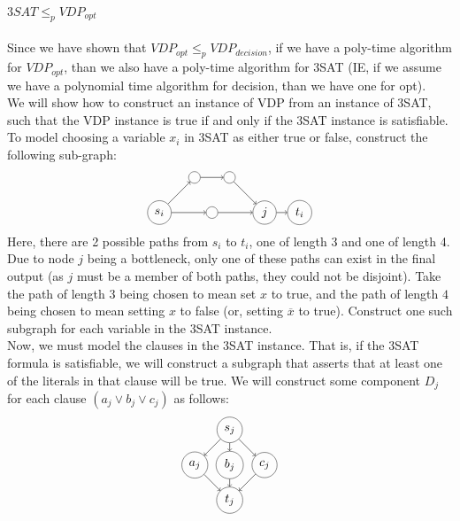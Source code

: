 \documentclass[letterpaper,notitlepage,twoside]{article}
\begin{document}
$3SAT \leq _{p} VDP_{opt}$\\\\
Since we have shown that $VDP_{opt} \leq _{p} VDP_{decision}$, if we have a poly-time algorithm for $VDP_{opt}$, than we also have a poly-time algorithm for 3SAT (IE, if we assume we have a polynomial time algorithm for decision, than we have one for opt). \\
We will show how to construct an instance of VDP from an instance of 3SAT, such that the VDP instance is true if and only if the 3SAT instance is satisfiable. To model choosing a variable $x_i$ in 3SAT as either true or false, construct the following sub-graph: \\
$$\begin{tikzpicture}
    \node[circle,draw=black!80] (a) at (0, 1) {$s_i$};
    \node[circle,draw=black!80] (b) at (1, 2) {};
    \node[circle,draw=black!80] (c) at (2, 2) {};
    \node[circle,draw=black!80] (d) at (1.5, 1) {};
    \node[circle,draw=black!80] (e) at (3, 1) {$j$};
    \node[circle,draw=black!80] (f) at (4, 1) {$t_i$};
    \path[->] (a) edge node {} (b);
    \path[->] (b) edge node {} (c);
    \path[->] (c) edge node {} (e);
    \path[->] (e) edge node {} (f);
    \path[->] (a) edge node {} (d);
    \path[->] (d) edge node {} (e);
\end{tikzpicture}$$
Here, there are 2 possible paths from $s_i$ to $t_i$, one of length 3 and one of length 4. Due to node $j$ being a bottleneck, only one of these paths can exist in the final output (as $j$ must be a member of both paths, they could not be disjoint). Take the path of length 3 being chosen to mean set $x$ to true, and the path of length $4$ being chosen to mean setting $x$ to false (or, setting $\overline x$ to true). Construct one such subgraph for each variable in the 3SAT instance. \\
Now, we must model the clauses in the 3SAT instance. That is, if the 3SAT formula is satisfiable, we will construct a subgraph that asserts that at least one of the literals in that clause will be true. We will construct some component $D_j$ for each clause $(a_j \lor b_j \lor c_j)$ as follows:
$$\begin{tikzpicture}
    \node[circle,draw=black!80] (s) at (1, 2) {$s_j$};
    \node[circle,draw=black!80] (a) at (0, 1) {$a_j$};
    \node[circle,draw=black!80] (b) at (1, 1) {$b_j$};
    \node[circle,draw=black!80] (c) at (2, 1) {$c_j$};
    \node[circle,draw=black!80] (t) at (1, 0) {$t_j$};
    \path[->] (s) edge node {} (a);
    \path[->] (s) edge node {} (b);
    \path[->] (s) edge node {} (c);
    \path[->] (a) edge node {} (t);
    \path[->] (b) edge node {} (t);
    \path[->] (c) edge node {} (t);
\end{tikzpicture}$$
\end{document}

